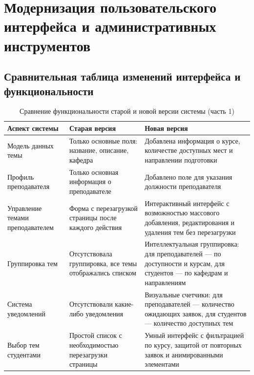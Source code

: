 \documentclass[a4paper,12pt]{article}
\begin{document}
\newpage
\section{Модернизация пользовательского интерфейса и административных инструментов}
\subsection{Сравнительная таблица изменений интерфейса и функциональности}

\begin{table}[H]
\centering
\caption{Сравнение функциональности старой и новой версии системы (часть 1)}
\begin{small}
\begin{tabular}{|p{}|p{}|p{}|}
\hline
\textbf{Аспект системы} & \textbf{Старая версия} & \textbf{Новая версия} \\
\hline
\hline
Модель данных темы & Только основные поля: название, описание, кафедра & Добавлена информация о курсе, количестве доступных мест и направлении подготовки \\
\hline
Профиль преподавателя & Только основная информация о преподавателе & Добавлено поле для указания должности преподавателя \\
\hline
Управление темами преподавателем & Форма с перезагрузкой страницы после каждого действия & Интерактивный интерфейс с возможностью массового добавления, редактирования и удаления тем без перезагрузки \\
\hline
Группировка тем & Отсутствовала группировка, все темы отображались списком & Интеллектуальная группировка: для преподавателей — по доступности и курсам, для студентов — по кафедрам и направлениям \\
\hline
Система уведомлений & Отсутствовали какие-либо уведомления & Визуальные счетчики: для преподавателей — количество ожидающих заявок, для студентов — количество доступных тем \\
\hline
Выбор тем студентами & Простой список с необходимостью перезагрузки страницы & Умный интерфейс с фильтрацией по курсу, защитой от повторных заявок и анимированными элементами \\
\hline
\end{tabular}
\end{small}
\label{tab:interface_comparison_1}
\end{table}
\end{document}
